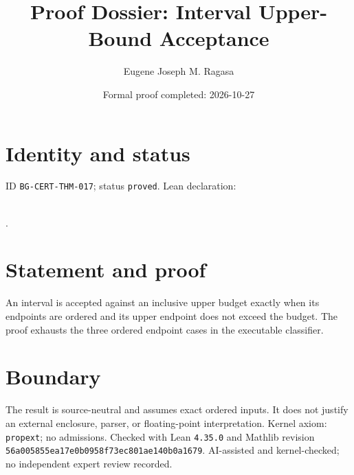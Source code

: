 \documentclass[11pt]{article}
\title{Proof Dossier: Interval Upper-Bound Acceptance}\author{Eugene Joseph M. Ragasa}\date{Formal proof completed: 2026-10-27}
\begin{document}
\maketitle
\section{Identity and status}
ID \texttt{BG-CERT-THM-017}; status \texttt{proved}. Lean declaration:
\par{}\\
{\tiny{}}.
\section{Statement and proof}
An interval is accepted against an inclusive upper budget exactly when its endpoints are
ordered and its upper endpoint does not exceed the budget. The proof exhausts the three
ordered endpoint cases in the executable classifier.
\section{Boundary}
The result is source-neutral and assumes exact ordered inputs. It does not justify an
external enclosure, parser, or floating-point interpretation. Kernel axiom:
\texttt{propext}; no admissions. Checked with Lean \texttt{4.35.0} and Mathlib revision
\texttt{56a005855ea17e0b0958f73ec801ae140b0a1679}. AI-assisted and kernel-checked;
no independent expert review recorded.
\end{document}

